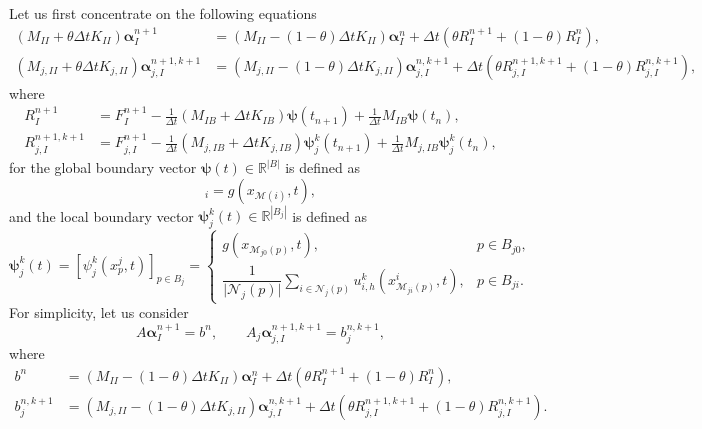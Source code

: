 \documentclass[a4paper, 11pt]{article}
\theoremstyle{remark}
\begin{document}
Let us first concentrate on the following equations
\begin{align*}
    \left(M_{II} + \theta\Delta t K_{II}\right) \boldsymbol{\alpha}_{I}^{n+1} &= \left(M_{II} - (1-\theta)\Delta t K_{II}\right)\boldsymbol{\alpha}_{I}^{n} + \Delta t\left(\theta R^{n+1}_{I} + (1-\theta)R^{n}_{I}\right),\\
    \left(M_{j, II} + \theta\Delta t K_{j, II}\right) \boldsymbol{\alpha}_{j, I}^{n+1, k+1} &= \left(M_{j, II} - (1-\theta)\Delta t K_{j, II}\right)\boldsymbol{\alpha}_{j, I}^{n, k+1} + \Delta t\left(\theta R^{n+1, k+1}_{j, I} + (1-\theta)R^{n, k+1}_{j, I}\right),
\end{align*}
where
\begin{align*}
    R^{n+1}_{I} &= F^{n+1}_{I} - \frac{1}{\Delta t}\left(M_{IB} +\Delta t K_{IB}\right)\boldsymbol{\psi}(t_{n+1}) + \frac{1}{\Delta t}M_{IB}\boldsymbol{\psi}(t_{n}),\\
    R^{n+1, k+1}_{j, I} &= F^{n+1}_{j, I} - \frac{1}{\Delta t}\left(M_{j, IB} +\Delta t K_{j, IB}\right)\boldsymbol{\psi}_{j}^{k}(t_{n+1}) + \frac{1}{\Delta t}M_{j, IB}\boldsymbol{\psi}_{j}^{k}(t_{n}),
\end{align*}
for the global boundary vector $\boldsymbol{\psi}(t) \in \mathbb{R}^{|B|}$ is defined as
\begin{equation*}
    [\boldsymbol{\psi}(t)]_{i} = g(x_{\mathcal{M}(i)}, t),
\end{equation*}
and the local boundary vector $\boldsymbol{\psi}_{j}^{k}(t) \in \mathbb{R}^{|B_j|}$ is defined as
\begin{equation*}
    \boldsymbol{\psi}_{j}^{k}(t) = [\psi_{j}^{k}(x^{j}_{p}, t)]_{p\in B_{j}} = 
    \begin{cases}
        g(x_{\mathcal{M}_{j0}(p)}, t), & p\in B_{j0},\\[3pt]
        \dfrac{1}{\lvert \mathcal{N}_{j}(p)\rvert}\sum\limits_{i\in\mathcal{N}_{j}(p)}u^{k}_{i, h}(x^{i}_{\mathcal{M}_{ji}(p)}, t), & p\in B_{ji}.
    \end{cases}
\end{equation*}
For simplicity, let us consider 
\begin{equation*}
    A\boldsymbol{\alpha}_{I}^{n+1} = b^{n}, \qquad A_{j}\boldsymbol{\alpha}_{j, I}^{n+1, k+1} = b_{j}^{n, k+1},
\end{equation*}
where
\begin{align*}
    b^{n} &= \left(M_{II} - (1-\theta)\Delta t K_{II}\right)\boldsymbol{\alpha}_{I}^{n} + \Delta t\left(\theta R^{n+1}_{I} + (1-\theta)R^{n}_{I}\right),\\
    b_{j}^{n, k+1} &= \left(M_{j, II} - (1-\theta)\Delta t K_{j, II}\right)\boldsymbol{\alpha}_{j, I}^{n, k+1} + \Delta t\left(\theta R^{n+1, k+1}_{j, I} + (1-\theta)R^{n, k+1}_{j, I}\right).
\end{align*}
\end{document}
